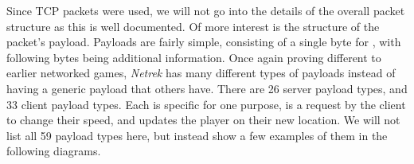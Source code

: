Since TCP packets were used, we will not go into the details of the overall packet structure as this is well documented. Of more interest is the structure of the packet's payload. Payloads are fairly simple, consisting of a single byte for , with following bytes being additional information. Once again proving different to earlier networked games, \textit{Netrek} has many different types of payloads instead of having a generic  payload that others have. There are 26 server payload types, and 33 client payload types. Each is specific for one purpose, \eg{}  is a request by the client to change their speed, and  updates the player on their new location. We will not list all 59 payload types here, but instead show a few examples of them in the following diagrams.


